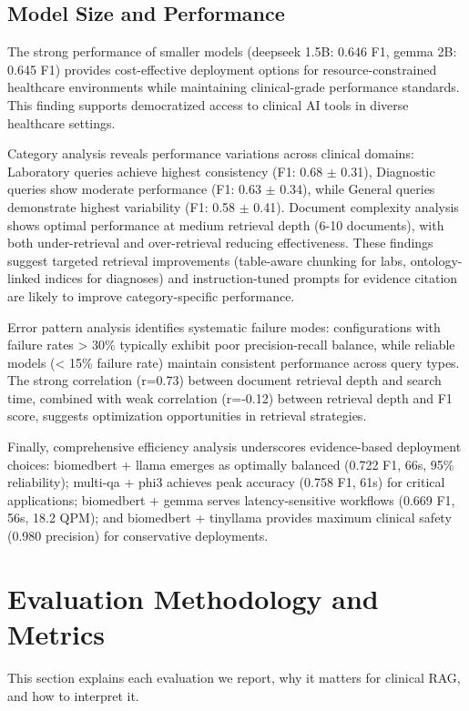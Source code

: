 \subsection{Model Size and Performance}
The strong performance of smaller models (deepseek 1.5B: 0.646 F1, gemma 2B: 0.645 F1) provides cost-effective deployment options for resource-constrained healthcare environments while maintaining clinical-grade performance standards. This finding supports democratized access to clinical AI tools in diverse healthcare settings.

Category analysis reveals performance variations across clinical domains: Laboratory queries achieve highest consistency (F1: 0.68 $\pm$ 0.31), Diagnostic queries show moderate performance (F1: 0.63 $\pm$ 0.34), while General queries demonstrate highest variability (F1: 0.58 $\pm$ 0.41). Document complexity analysis shows optimal performance at medium retrieval depth (6-10 documents), with both under-retrieval and over-retrieval reducing effectiveness. These findings suggest targeted retrieval improvements (table-aware chunking for labs, ontology-linked indices for diagnoses) and instruction-tuned prompts for evidence citation are likely to improve category-specific performance.

Error pattern analysis identifies systematic failure modes: configurations with failure rates > 30\% typically exhibit poor precision-recall balance, while reliable models (< 15\% failure rate) maintain consistent performance across query types. The strong correlation (r=0.73) between document retrieval depth and search time, combined with weak correlation (r=-0.12) between retrieval depth and F1 score, suggests optimization opportunities in retrieval strategies.

Finally, comprehensive efficiency analysis underscores evidence-based deployment choices: biomedbert + llama emerges as optimally balanced (0.722 F1, 66s, 95\% reliability); multi-qa + phi3 achieves peak accuracy (0.758 F1, 61s) for critical applications; biomedbert + gemma serves latency-sensitive workflows (0.669 F1, 56s, 18.2 QPM); and biomedbert + tinyllama provides maximum clinical safety (0.980 precision) for conservative deployments.

\section{Evaluation Methodology and Metrics}
This section explains each evaluation we report, why it matters for clinical RAG, and how to interpret it.

